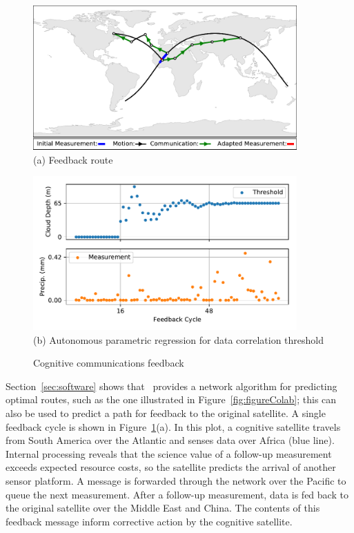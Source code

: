 \documentclass[conference]{IEEEtran}
\newcommand{\project}{{\sc{Collaborate}}~}
\begin{document}
\begin{figure}[b!]
  \begin{minipage}[b]{\linewidth}
    \begin{center}
      \includegraphics[width=0.9\textwidth]{images/loop.pdf} \\
      {\footnotesize(a) Feedback route}
    \end{center}
  \end{minipage}
  \begin{minipage}[b]{\linewidth}
    \begin{center}
      \includegraphics[width=0.9\textwidth]{images/regression.pdf} \\
      {\footnotesize(b) Autonomous parametric regression for data correlation
        threshold}
    \end{center}
  \end{minipage}
  \caption{Cognitive communications feedback}
  \label{fig:feedback}
\end{figure}

Section~\ref{sec:software} shows that \project provides a network algorithm for predicting optimal routes, such as the one illustrated in Figure~\ref{fig:figureColab}; this can also be used to predict a path for feedback to the original satellite.  A single feedback cycle is shown in Figure~\ref{fig:feedback}(a).  In this plot, a cognitive satellite travels from South America over the Atlantic and senses data over Africa (blue line).  Internal processing reveals that the science value of a follow-up measurement exceeds expected resource costs, so the satellite predicts the arrival of another sensor platform.  A message is forwarded through the network over the Pacific to queue the next measurement.  After a follow-up measurement, data is fed back to the original satellite over the Middle East and China.  The contents of this feedback message inform corrective action by the cognitive satellite.
\end{document}
